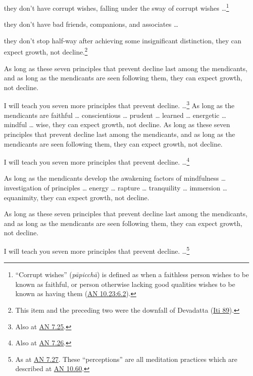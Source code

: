 \documentclass[12pt,openany]{book}%
\begin{document}
they don’t have corrupt wishes, falling under the sway of corrupt wishes …\footnote{“Corrupt wishes” (\textit{\textsanskrit{pāpicchā}}) is defined as when a faithless person wishes to be known as faithful, or person otherwise lacking good qualities wishes to be known as having them (\href{https://suttacentral.net/an10.23/en/sujato\#6.2}{AN 10.23:6.2}). } 

they don’t have bad friends, companions, and associates … 

they don’t stop half-way after achieving some insignificant distinction, they can expect growth, not decline.\footnote{This item and the preceding two were the downfall of Devadatta (\href{https://suttacentral.net/iti89/en/sujato}{Iti 89}). } 

As long as these seven principles that prevent decline last among the mendicants, and as long as the mendicants are seen following them, they can expect growth, not decline. 

I will teach you seven more principles that prevent decline. …\footnote{Also at \href{https://suttacentral.net/an7.25/en/sujato}{AN 7.25}. } As long as the mendicants are faithful … conscientious … prudent … learned … energetic … mindful … wise, they can expect growth, not decline. As long as these seven principles that prevent decline last among the mendicants, and as long as the mendicants are seen following them, they can expect growth, not decline. 

I will teach you seven more principles that prevent decline. …\footnote{Also at \href{https://suttacentral.net/an7.26/en/sujato}{AN 7.26}. } 

As long as the mendicants develop the awakening factors of mindfulness … investigation of principles … energy … rapture … tranquility … immersion … equanimity, they can expect growth, not decline. 

As long as these seven principles that prevent decline last among the mendicants, and as long as the mendicants are seen following them, they can expect growth, not decline. 

I will teach you seven more principles that prevent decline. …\footnote{As at \href{https://suttacentral.net/an7.27/en/sujato}{AN 7.27}. These “perceptions” are all meditation practices which are described at \href{https://suttacentral.net/an10.60/en/sujato}{AN 10.60}. } 
\end{document}
